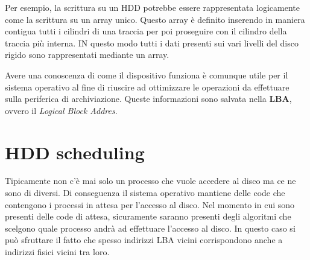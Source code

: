 Per esempio, la scrittura su un HDD potrebbe essere rappresentata logicamente come la scrittura su un array unico. Questo array è definito inserendo in maniera contigua tutti i cilindri di una traccia per poi proseguire con il cilindro della traccia più interna. IN questo modo tutti i dati presenti sui vari livelli del disco rigido sono rappresentati mediante un array. 

Avere una conoscenza di come il dispositivo funziona è comunque utile per il sistema operativo al fine di riuscire ad ottimizzare le operazioni da effettuare sulla periferica di archiviazione. Queste informazioni sono salvata nella \textbf{LBA}, ovvero il \textit{Logical Block Addres}.

% 
\section{HDD scheduling}
Tipicamente non c'è mai solo un processo che vuole accedere al disco ma ce ne sono di diversi. Di conseguenza il sistema operativo mantiene delle code che contengono i processi in attesa per l'accesso al disco. Nel momento in cui sono presenti delle code di attesa, sicuramente saranno presenti degli algoritmi che scelgono quale processo andrà ad effettuare l'accesso al disco. In questo caso si può sfruttare il fatto che spesso indirizzi LBA vicini corrispondono anche a indirizzi fisici vicini tra loro. 

% 
